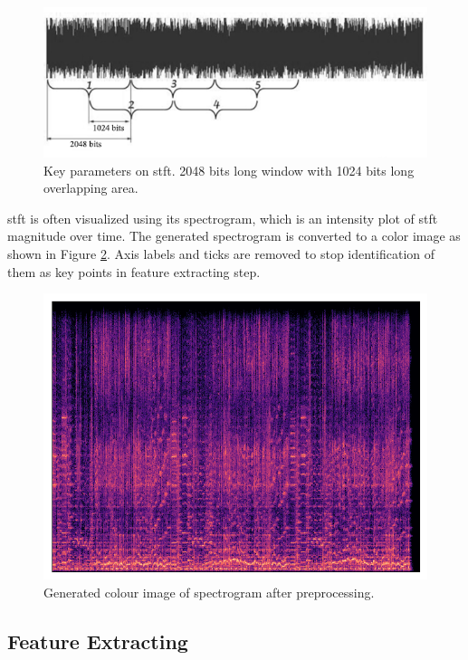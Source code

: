 \begin{figure}[h]
  \centering
  \includegraphics[scale=0.6]{research_paper/graphics/parameters.png}
  \caption{Key parameters on \gls{stft}. 2048 bits long window with 1024 bits long overlapping area.}
  \label{fig:parameters}
\end{figure}

\gls{stft} is often visualized using its spectrogram\cite{Kehtarnavaz2008}, which is an intensity plot of \gls{stft} magnitude over time. 
The generated spectrogram is converted to a color image as shown in Figure \ref{fig:spectrogram}. Axis labels and ticks are removed to stop
identification of them as key points in feature extracting step. 

\begin{figure}[h]
  \centering
  \includegraphics[scale=0.5]{research_paper/graphics/spectrogram.png}
  \caption{Generated colour image of spectrogram after preprocessing.}
  \label{fig:spectrogram}
\end{figure}

\subsection{Feature Extracting}

